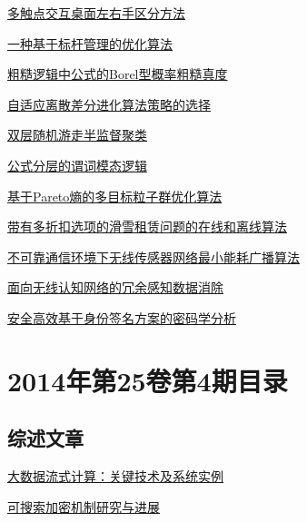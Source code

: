 \documentclass[a4paper]{article}
\begin{document}
\href{http://www.jos.org.cn/ch/reader/download_pdf.aspx?file_no=4418&year_id=2014&quarter_id=5&falg=1}{多触点交互桌面左右手区分方法}

\href{http://www.jos.org.cn/ch/reader/download_pdf.aspx?file_no=4428&year_id=2014&quarter_id=5&falg=1}{一种基于标杆管理的优化算法}

\href{http://www.jos.org.cn/ch/reader/download_pdf.aspx?file_no=4441&year_id=2014&quarter_id=5&falg=1}{粗糙逻辑中公式的Borel型概率粗糙真度}

\href{http://www.jos.org.cn/ch/reader/download_pdf.aspx?file_no=4448&year_id=2014&quarter_id=5&falg=1}{自适应离散差分进化算法策略的选择}

\href{http://www.jos.org.cn/ch/reader/download_pdf.aspx?file_no=4452&year_id=2014&quarter_id=5&falg=1}{双层随机游走半监督聚类}

\href{http://www.jos.org.cn/ch/reader/download_pdf.aspx?file_no=4500&year_id=2014&quarter_id=5&falg=1}{公式分层的谓词模态逻辑}

\href{http://www.jos.org.cn/ch/reader/download_pdf.aspx?file_no=4496&year_id=2014&quarter_id=5&falg=1}{基于Pareto熵的多目标粒子群优化算法}

\href{http://www.jos.org.cn/ch/reader/download_pdf.aspx?file_no=4492&year_id=2014&quarter_id=5&falg=1}{带有多折扣选项的滑雪租赁问题的在线和离线算法}

\href{http://www.jos.org.cn/ch/reader/download_pdf.aspx?file_no=4455&year_id=2014&quarter_id=5&falg=1}{不可靠通信环境下无线传感器网络最小能耗广播算法}

\href{http://www.jos.org.cn/ch/reader/download_pdf.aspx?file_no=4524&year_id=2014&quarter_id=5&falg=1}{面向无线认知网络的冗余感知数据消除}

\href{http://www.jos.org.cn/ch/reader/download_pdf.aspx?file_no=4526&year_id=2014&quarter_id=5&falg=1}{安全高效基于身份签名方案的密码学分析}


\section{\textbf{2014年第25卷第4期目录}}
\subsection{综述文章}
\href{http://www.jos.org.cn/ch/reader/download_pdf.aspx?file_no=4558&year_id=2014&quarter_id=4&falg=1}{大数据流式计算：关键技术及系统实例}

\href{http://www.jos.org.cn/ch/reader/download_pdf.aspx?file_no=4554&year_id=2014&quarter_id=4&falg=1}{可搜索加密机制研究与进展}
\end{document}

